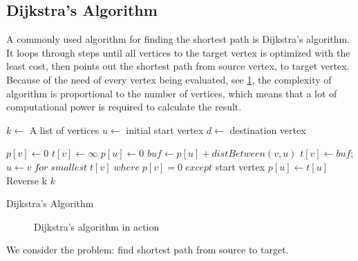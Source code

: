   \subsection{Dijkstra's Algorithm}


  A commonly used algorithm for finding the shortest path is Dijkstra's algorithm. It loops through steps until all vertices to the target vertex is optimized with the least cost, then points out the shortest path from source vertex, to target vertex. Because of the need of every vertex being evaluated, see \cref{fig:dijkstra}, the complexity of algorithm is proportional to the number of vertices, which means that a lot of computational power is required to calculate the result. \cite{Dijkstr1959}

  \begin{algorithm} \label{algo:Dij}
   $k \gets $ A list of vertices\;
   $u \gets $ initial start vertex\;
   $d \gets $ destination vertex\;

  {
    $p[v] \gets  0$\;
    $t[v] \gets \infty$\;
  }
  $p[u] \gets 0$\;
  {
    {
      $buf \gets p[u] + distBetween(v, u)$\;
      {
        $t[v] \gets buf$;
      }
    } 
    $u \gets v \; for \; smallest \; t[v] \; where \; p[v] = 0 \; except$ start vertex\;
    $p[u] \gets t[u]$\;
  }
  {
      {
      }
    }
  Reverse k\;
  \Return $k$\;
 \caption{Dijkstra's Algorithm}
\end{algorithm}


  \begin{figure}[ht!]
    \centering
    \caption{Dijkstra's algorithm in action}
    \label{fig:dijkstra}
  \end{figure}

  We consider the problem: find shortest path from source to target.

